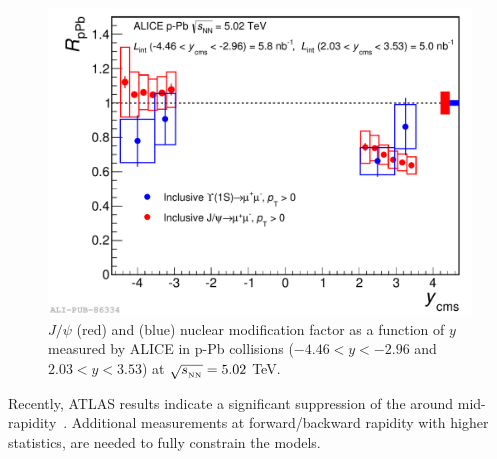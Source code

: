 \begin{figure}[!t]
\begin{center}
\includegraphics[width=0.8\linewidth]{Chapters/Analysis/Figs/2014-Oct-08-RpPb_Ups_Jpsi_b.pdf}
\caption{$J/\psi$ (red) and \upsis (blue) nuclear modification factor as a function of $y$ measured by ALICE in p-Pb collisions ($-4.46<y<-2.96$ and $2.03<y<3.53$) at $\sqrt{s_{_{\rm NN}}}=5.02$ TeV.}
\label{fig:ALICE_pPb_jpsi_upsi}
\end{center}
\end{figure}

Recently, ATLAS results indicate a significant suppression of the \upsis around mid-rapidity~\cite{Aaboud:2017cif}.  
Additional measurements at forward/backward rapidity with higher statistics, are needed to fully constrain the models.

